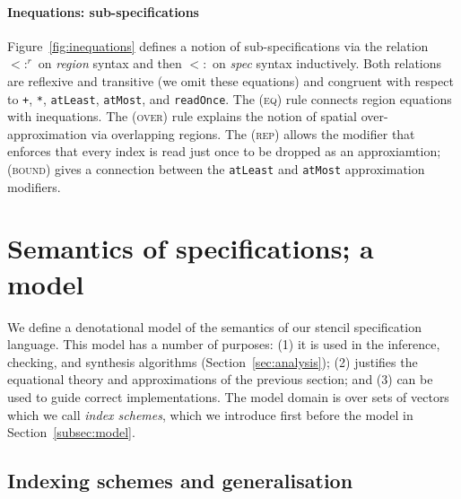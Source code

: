 \documentclass[9pt]{sigplanconf}
\theoremstyle{definition}
\newcommand{\term}[1]{\texttt{#1}}
\newcommand{\trule}[1]{{\footnotesize{#1}}}
\begin{document}
\paragraph{Inequations: sub-specifications}

Figure~\ref{fig:inequations} defines a notion of sub-specifications
via the relation $<:^r$ on \textit{region}
syntax and then $<:$ on \textit{spec} syntax inductively.
Both relations are reflexive and transitive (we omit
these equations) and congruent
with respect to \term{+}, \term{*}, \term{atLeast}, \term{atMost},
and \term{readOnce}. The (\trule{\textsc{eq}}) rule connects region
equations with inequations. The (\trule{\textsc{over}}) rule explains
the notion of spatial over-approximation via overlapping regions.
The (\trule{\textsc{rep}}) allows the modifier that
enforces that every index is read just once to be dropped
as an approxiamtion; (\trule{\textsc{bound}}) gives
a connection between the \term{atLeast} and \term{atMost}
approximation modifiers.

\section{Semantics of specifications; a model}
\label{sec:semantics}

\newcommand{\domainVal}{\mathbb{Z}_\infty}

We define a denotational model of the semantics of our 
stencil specification language. This model has a number of purposes: (1) it is used in the inference,
checking, and synthesis algorithms (Section~\ref{sec:analysis}); (2)
justifies the equational
theory and approximations of the previous section; and (3) can be used
to guide correct implementations. The model domain is over sets of vectors which we call \emph{index
  schemes}, which we introduce first before the model in Section~\ref{subsec:model}.

\subsection{Indexing schemes and generalisation}
\label{subsec:schemes-and-gen}
\end{document}
